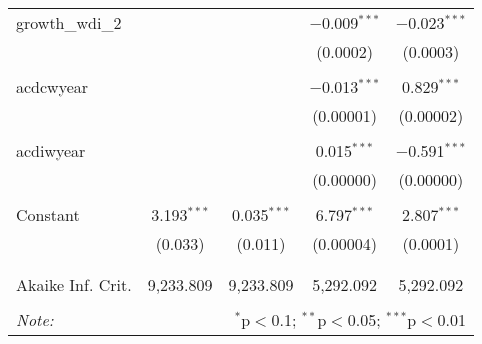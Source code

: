 \begin{table}[!htbp]
\begin{tabular}{@{\extracolsep{5pt}}lcccc}
 growth\_wdi\_2 &  &  & $-$0.009$^{***}$ & $-$0.023$^{***}$ \\ 
  &  &  & (0.0002) & (0.0003) \\ 
  & & & & \\ 
 acdcwyear &  &  & $-$0.013$^{***}$ & 0.829$^{***}$ \\ 
  &  &  & (0.00001) & (0.00002) \\ 
  & & & & \\ 
 acdiwyear &  &  & 0.015$^{***}$ & $-$0.591$^{***}$ \\ 
  &  &  & (0.00000) & (0.00000) \\ 
  & & & & \\ 
 Constant & 3.193$^{***}$ & 0.035$^{***}$ & 6.797$^{***}$ & 2.807$^{***}$ \\ 
  & (0.033) & (0.011) & (0.00004) & (0.0001) \\ 
  & & & & \\ 
\hline \\[-1.8ex] 
Akaike Inf. Crit. & 9,233.809 & 9,233.809 & 5,292.092 & 5,292.092 \\ 
\hline 
\hline \\[-1.8ex] 
\textit{Note:}  & \multicolumn{4}{r}{$^{*}$p$<$0.1; $^{**}$p$<$0.05; $^{***}$p$<$0.01} \\ 
\end{tabular} 
\end{table} 
